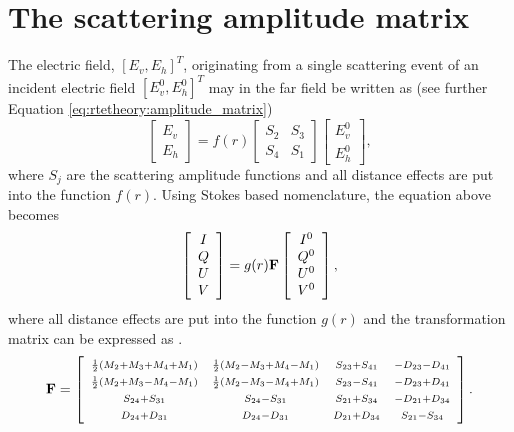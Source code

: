 \section{The scattering amplitude matrix}
\label{sec:polarization:ampmatrix}
The electric field, $[E_v,E_h]^T$, originating from a single scattering event
of an incident electric field $[E_v^0,E_h^0]^T$ may in the far field be written
as (see further Equation \ref{eq:rtetheory:amplitude_matrix})
\begin{equation}
  \label{eq:polarisation:ampmatrix1}
   \left[ \begin{array}{c} E_v \\ E_h \end{array} \right] =
   f(r)
   \left[ \begin{array}{cc} S_2 & S_3 \\ S_4 & S_1 \end{array} \right]
   \left[ \begin{array}{c} E_v^0 \\ E_h^0 \end{array} \right], 
\end{equation}
where $S_j$ are the scattering amplitude functions and all distance
effects are put into the function $f(r)$. Using Stokes based
nomenclature, the equation above becomes
\begin{equation}
  \label{eq:polarisation:ampmatrix2}
   \left[ \begin{array}{c} I\\Q\\U\\V \end{array} \right] =
   g(r)\mathbf{F}
   \left[ \begin{array}{c} I^0\\Q^0\\U^0\\V^0 \end{array} \right],
\end{equation}
where all distance effects are put into the function $g(r)$ and the
transformation matrix  can be expressed as \citep[Sec.\ 5.4.3]{liou:02}.
\begin{equation}
  \label{eq:polarisation:Fmatrix}
  \mathbf{F} = \left[ \begin{array}{cccc} 
    \scriptstyle \frac{1}{2}(M_2+M_3+M_4+M_1) & 
    \scriptstyle \frac{1}{2}(M_2-M_3+M_4-M_1) & 
    \scriptstyle S_{23}+S_{41} & \scriptstyle -D_{23}-D_{41} \\
    \scriptstyle \frac{1}{2}(M_2+M_3-M_4-M_1) & 
    \scriptstyle \frac{1}{2}(M_2-M_3-M_4+M_1) & 
    \scriptstyle S_{23}-S_{41} & \scriptstyle -D_{23}+D_{41} \\
    \scriptstyle S_{24}+S_{31} & \scriptstyle S_{24}-S_{31} & 
    \scriptstyle S_{21}+S_{34} & \scriptstyle -D_{21}+D_{34} \\
    \scriptstyle D_{24}+D_{31} & \scriptstyle D_{24}-D_{31} & 
    \scriptstyle D_{21}+D_{34} & \scriptstyle S_{21}-S_{34} 
  \end{array} \right].
\end{equation}
